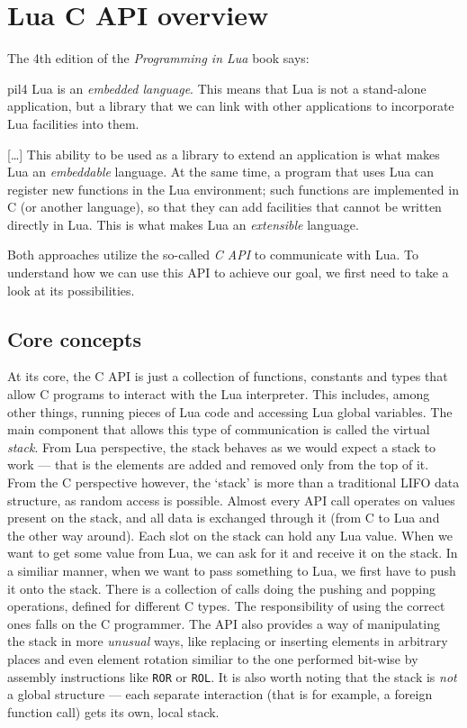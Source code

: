 \documentclass[polish, english]{iithesis}
\begin{document}
\chapter{Lua C API overview}
  The 4th edition of the \textit{Programming in Lua} book says:
  \begin{displaycquote}{pil4}
    Lua is an \textit{embedded language}. 
    This means that Lua is not a stand-alone application, but a library that we can link with other applications to incorporate Lua facilities into them.

    [\ldots] This ability to be used as a library to extend an application is what makes Lua an \textit{embeddable} language. 
    At the same time, a program that uses Lua can register new functions in the Lua environment; such functions are implemented in C (or another language), so that they can add facilities that cannot be written directly in Lua. 
    This is what makes Lua an \textit{extensible} language. 
  \end{displaycquote}
  Both approaches utilize the so-called \textit{C API} to communicate with Lua.
  To understand how we can use this API to achieve our goal, we first need to take a look at its possibilities.
  \section{Core concepts}
    At its core, the C API is just a collection of functions, constants and types that allow C programs to interact with the Lua interpreter.
    This includes, among other things, running pieces of Lua code and accessing Lua global variables.
    The main component that allows this type of communication is called the virtual \textit{stack}.
    From Lua perspective, the stack behaves as we would expect a stack to work --- that is the elements are added and removed only from the top of it.
    From the C perspective however, the `stack' is more than a traditional LIFO data structure, as random access is possible. 
    Almost every API call operates on values present on the stack, and all data is exchanged through it (from C to Lua and the other way around).  
    Each slot on the stack can hold any Lua value.
    When we want to get some value from Lua, we can ask for it and receive it on the stack.
    In a similiar manner, when we want to pass something to Lua, we first have to push it onto the stack.
    There is a collection of calls doing the pushing and popping operations, defined for different C types.
    The responsibility of using the correct ones falls on the C programmer.
    The API also provides a way of manipulating the stack in more \textit{unusual} ways, like replacing or inserting elements in arbitrary places and even element rotation similiar to the one performed bit-wise by assembly instructions like \texttt{ROR} or \texttt{ROL}.
    It is also worth noting that the stack is \emph{not} a global structure --- each separate interaction (that is for example, a foreign function call) gets its own, local stack.
\end{document}
